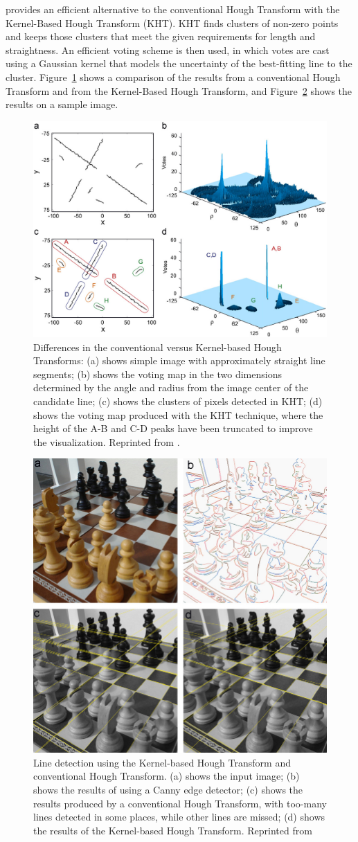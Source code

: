 \documentclass[DM,authoryear,toc]{lsstdoc}
\begin{document}
\cite{fernandes:2008} provides an efficient alternative to the conventional Hough Transform with the Kernel-Based Hough Transform (KHT). KHT finds clusters of non-zero points and keeps those clusters that meet the given requirements for length and straightness. An efficient voting scheme is then used, in which votes are cast using a Gaussian kernel that models the uncertainty of the best-fitting line to the cluster. Figure~\ref{fig: hough demo} shows a comparison of the results from a conventional Hough Transform and from the Kernel-Based Hough Transform, and Figure~\ref{fig: hough results} shows the results on a sample image.
\begin{figure}
\centering
\includegraphics[width=0.5\columnwidth]{figures/hough_voting_demo.jpg}
\caption{Differences in the conventional versus Kernel-based Hough Transforms: (a) shows simple image with approximately straight line segments; (b) shows the voting map in the two dimensions determined by the angle and radius from the image center of the candidate line; (c) shows the clusters of pixels detected in KHT; (d) shows the voting map produced with the KHT technique, where the height of the A-B and C-D peaks have been truncated to improve the visualization. Reprinted from \cite{fernandes:2008}.}
\label{fig: hough demo}
\end{figure}
\begin{figure}
\centering
\includegraphics[width=0.5\columnwidth]{figures/hough_line_identification.jpg}
\caption{Line detection using the Kernel-based Hough Transform and conventional Hough Transform. (a) shows the input image; (b) shows the results of using a Canny edge detector; (c) shows the results produced by a conventional Hough Transform, with too-many lines detected in some places, while other lines are missed; (d) shows the results of the Kernel-based Hough Transform. Reprinted from \cite{fernandes:2008}}
\label{fig: hough results}
\end{figure}
\end{document}
